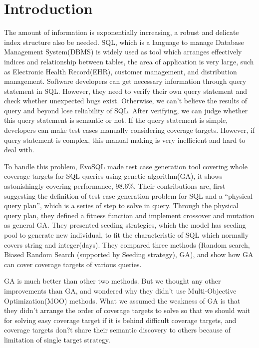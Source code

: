 \chapter{Introduction}

The amount of information is exponentially increasing, a robust and delicate index structure also be needed. SQL, which is a language to manage Database Management System(DBMS) is widely used as tool which arranges effectively indices and relationship between tables, the area of application is very large, such as Electronic Health Record(EHR), customer management, and distribution management. Software developers can get necessary information through query statement in SQL. However, they need to verify their own query statement and check whether unexpected bugs exist. Otherwise, we can't believe the results of query and beyond lose reliability of SQL. After verifying, we can judge whether this query statement is semantic or not. If the query statement is simple, developers can make test cases manually considering coverage targets. However, if query statement is complex, this manual making is very inefficient and hard to deal with.

To handle this problem, EvoSQL\cite{castelein2018search} made test case generation tool covering whole coverage targets for SQL queries using genetic algorithm(GA), it shows astonishingly covering performance, 98.6\%. Their contributions are, first suggesting the definition of test case generation problem for SQL and a ``physical query plan'', which is a series of step to solve in query. Through the physical query plan, they defined a fitness function and implement crossover and mutation as general GA. They presented seeding strategies, which the model has seeding pool to generate new individual, to fit the characteristic of SQL which normally covers string and integer(days). They compared three methods (Random search, Biased Random Search (supported by Seeding strategy), GA), and show how GA can cover coverage targets of various queries.
 

GA is much better than other two methods. But we thought any other improvements than GA, and wondered why they didn't use Multi-Objective Optimization(MOO) methods. What we assumed the weakness of GA is that they didn't arrange the order of coverage targets to solve so that we should wait for solving easy coverage target if it is behind difficult coverage targets, and coverage targets don?t share their semantic discovery to others because of limitation of single target strategy.
 

